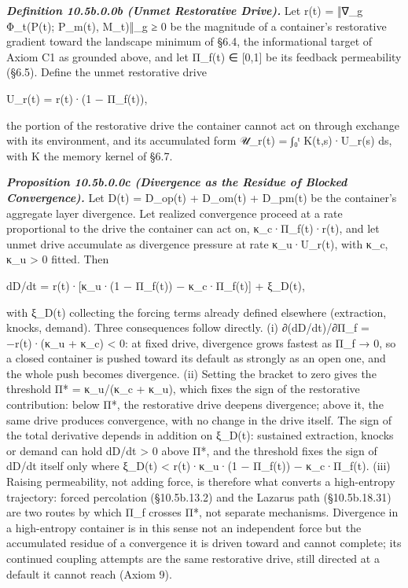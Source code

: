 \documentclass[
]{article}
\begin{document}
\emph{\textbf{Definition 10.5b.0.0b (Unmet Restorative Drive).}} Let
r(t) = ‖∇\_g Φ\_t(P(t); P\_m(t), M\_t)‖\_g ≥ 0 be the magnitude of a
container's restorative gradient toward the landscape minimum of §6.4,
the informational target of Axiom C1 as grounded above, and let Π\_f(t)
∈ {[}0,1{]} be its feedback permeability (§6.5). Define the unmet
restorative drive

U\_r(t) = r(t)·(1 − Π\_f(t)),

the portion of the restorative drive the container cannot act on through
exchange with its environment, and its accumulated form 𝒰\_r(t) = ∫₀ᵗ
K(t,s)·U\_r(s) ds, with K the memory kernel of §6.7.

\emph{\textbf{Proposition 10.5b.0.0c (Divergence as the Residue of
Blocked Convergence).}} Let D(t) = D\_op(t) + D\_om(t) + D\_pm(t) be the
container's aggregate layer divergence. Let realized convergence proceed
at a rate proportional to the drive the container can act on,
κ\_c·Π\_f(t)·r(t), and let unmet drive accumulate as divergence pressure
at rate κ\_u·U\_r(t), with κ\_c, κ\_u \textgreater{} 0 fitted. Then

dD/dt = r(t)·{[}κ\_u·(1 − Π\_f(t)) − κ\_c·Π\_f(t){]} + ξ\_D(t),

with ξ\_D(t) collecting the forcing terms already defined elsewhere
(extraction, knocks, demand). Three consequences follow directly. (i)
∂(dD/dt)/∂Π\_f = −r(t)·(κ\_u + κ\_c) \textless{} 0: at fixed drive,
divergence grows fastest as Π\_f → 0, so a closed container is pushed
toward its default as strongly as an open one, and the whole push
becomes divergence. (ii) Setting the bracket to zero gives the threshold
Π* = κ\_u/(κ\_c + κ\_u), which fixes the sign of the restorative
contribution: below Π*, the restorative drive deepens divergence; above
it, the same drive produces convergence, with no change in the drive
itself. The sign of the total derivative depends in addition on ξ\_D(t):
sustained extraction, knocks or demand can hold dD/dt \textgreater{} 0
above Π*, and the threshold fixes the sign of dD/dt itself only where
\textbar ξ\_D(t)\textbar{} \textless{} r(t)·\textbar κ\_u·(1 − Π\_f(t))
− κ\_c·Π\_f(t)\textbar. (iii) Raising permeability, not adding force, is
therefore what converts a high-entropy trajectory: forced percolation
(§10.5b.13.2) and the Lazarus path (§10.5b.18.31) are two routes by
which Π\_f crosses Π*, not separate mechanisms. Divergence in a
high-entropy container is in this sense not an independent force but the
accumulated residue of a convergence it is driven toward and cannot
complete; its continued coupling attempts are the same restorative
drive, still directed at a default it cannot reach (Axiom 9).
\end{document}
